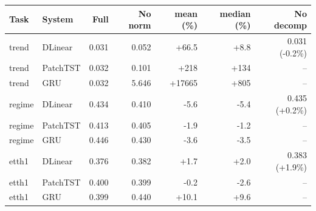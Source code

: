 \begin{tabular}{llrrrrr}
\toprule
Task & System & Full & No norm & mean (\%) & median (\%) & No decomp\\
\midrule
trend & DLinear & 0.031 & 0.052 & +66.5 & +8.8 & 0.031 (-0.2\%)\\
trend & PatchTST & 0.032 & 0.101 & +218 & +134 & --\\
trend & GRU & 0.032 & 5.646 & +17665 & +805 & --\\
regime & DLinear & 0.434 & 0.410 & -5.6 & -5.4 & 0.435 (+0.2\%)\\
regime & PatchTST & 0.413 & 0.405 & -1.9 & -1.2 & --\\
regime & GRU & 0.446 & 0.430 & -3.6 & -3.5 & --\\
etth1 & DLinear & 0.376 & 0.382 & +1.7 & +2.0 & 0.383 (+1.9\%)\\
etth1 & PatchTST & 0.400 & 0.399 & -0.2 & -2.6 & --\\
etth1 & GRU & 0.399 & 0.440 & +10.1 & +9.6 & --\\
\bottomrule
\end{tabular}